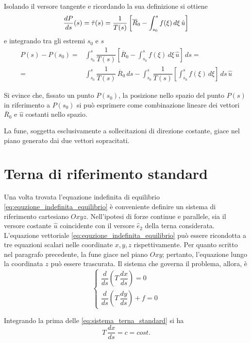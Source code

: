  Isolando il versore tangente e ricordando la sua definizione si ottiene
 \[
\dfrac{dP}{ds}(s)	 = \hat{\tau} (s) = \dfrac{1}{T(s)}\left[\overline{R}_0 - \int_{s_0}^s f(\xi)\,d\xi\,\hat{u}\right]
 \]
e integrando tra gli estremi $s_0$ e $s$
\begin{align*}
P(s) - P(s_0) =& \int_{s_0}^s \dfrac{1}{T(s)}\left[\overline{R}_0 - \int_{s_0}^s f(\xi)\,d\xi\,\hat{u}\right]\,ds = \\
=& \int_{s_0}^s \dfrac{1}{T(s)}\,\overline{R}_0\,ds - \int_{s_0}^s \dfrac{1}{T(s)}\left[\int_{s_0}^s f(\xi)\,d\xi\right]\,ds\,\hat{u}
\end{align*}

Si evince che, fissato un punto $P(s_0)$, la posizione nello spazio del punto $P(s)$ in riferimento a $P(s_0)$ si può esprimere come combinazione lineare dei vettori $\overline{R}_0$ e $\hat{u}$ costanti nello spazio.

La fune, soggetta esclusivamente a sollecitazioni di direzione costante, giace nel piano generato dai due vettori sopracitati.

\section{Terna di riferimento standard}
Una volta trovata l'equazione indefinita di equilibrio \eqref{eq:equzione_indefinita_equilibrio} è conveniente definire un sistema di riferimento cartesiano $Oxyz$. Nell'ipotesi di forze continue e parallele, sia il versore costante $\hat{u}$ coincidente con il versore $\hat{e}_2$ della terna considerata. 
L'equazione vettoriale \eqref{eq:equzione_indefinita_equilibrio} può essere ricondotta a tre equazioni scalari nelle coordinate $x, y, z$ rispettivamente. Per quanto scritto nel paragrafo precedente, la fune giace nel piano $Oxy$; pertanto, l'equazione lungo la coordinata $z$ può essere trascurata. Il sistema che governa il problema, allora, è
\begin{equation}
	\label{eq:sistema_terna_standard}
	\begin{cases}
		\dfrac{d}{ds}\left(T\,\dfrac{dx}{ds}\right) = 0\\[1.5ex]
		\dfrac{d}{ds}\left(T\,\dfrac{dy}{ds}\right) + f = 0
	\end{cases}
\end{equation}

Integrando la prima delle \eqref{eq:sistema_terna_standard} si ha
\begin{equation}
	\label{eq:tensione_direzione_x}
T\,\dfrac{dx}{ds} = c = cost.	
\end{equation}

